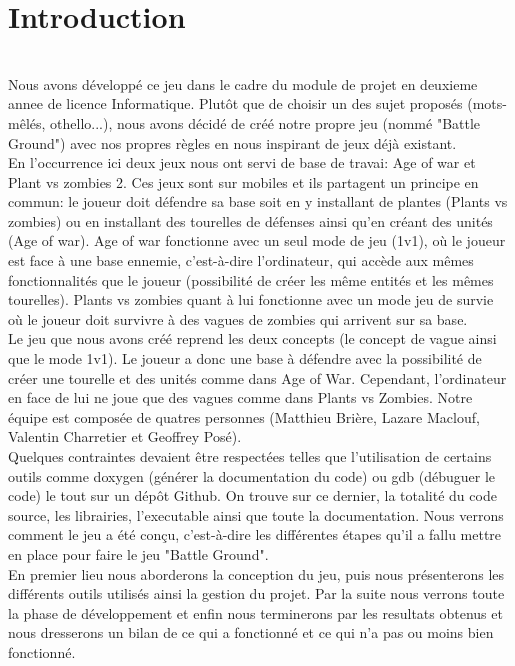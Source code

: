 \documentclass[a4paper,11pt]{article}
\begin{document}
\section {Introduction}
\\Nous avons développé ce jeu dans le cadre du module de projet en deuxieme annee de licence Informatique. Plutôt que de choisir un des sujet proposés (mots-mêlés, othello...), nous avons décidé
de créé notre propre jeu (nommé "Battle Ground") avec nos propres règles en nous inspirant de jeux déjà existant.\\ En l'occurrence ici deux jeux nous ont servi de base de travai: Age of war et Plant vs zombies 2. Ces jeux sont sur mobiles et ils partagent un principe en commun: le joueur doit défendre sa base soit en y installant de plantes (Plants vs zombies) 
ou en installant des tourelles de défenses ainsi qu'en créant des unités (Age of war). Age of war fonctionne avec un seul mode de jeu (1v1), où le joueur est face à une base ennemie, c'est-à-dire l'ordinateur, qui accède 
aux mêmes fonctionnalités que le joueur (possibilité de créer les même entités et les mêmes tourelles). Plants vs zombies quant à lui fonctionne avec un mode jeu de survie où le joueur doit survivre à des vagues de zombies qui arrivent sur sa base.\\
Le jeu que nous avons créé reprend les deux concepts (le concept de vague ainsi que le mode 1v1). 
Le joueur a donc une base à défendre avec la possibilité de créer une tourelle et des unités comme dans Age of War. Cependant,
l'ordinateur en face de lui ne joue que des vagues comme dans Plants vs Zombies.
Notre équipe est composée de quatres personnes (Matthieu Brière, Lazare Maclouf, Valentin Charretier et Geoffrey Posé).\\
Quelques contraintes devaient être respectées telles que l'utilisation de certains outils comme doxygen (générer la documentation du code) ou
gdb (débuguer le code) le tout sur un dépôt Github. On trouve sur ce dernier, la totalité du code source, les librairies, l'executable ainsi
que toute la documentation.
Nous verrons comment le jeu a été conçu, c'est-à-dire les différentes étapes qu'il a fallu mettre en place pour faire le jeu "Battle Ground".\\
En premier lieu nous aborderons la conception du jeu, puis nous présenterons les différents outils utilisés ainsi la gestion du projet. Par la suite
nous verrons toute la phase de développement et enfin nous terminerons par les resultats obtenus et nous dresserons un bilan de ce qui a fonctionné et ce qui n'a pas
ou moins bien fonctionné.\\
\end{document}
